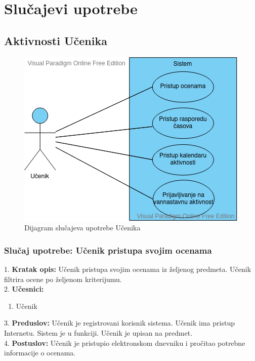 \documentclass{article}
\begin{document}
\newpage
\section{Slučajevi upotrebe}

\subsection{Aktivnosti Učenika}

\begin{figure} [!ht]
    \begin{center}
        \includegraphics[scale=0.6]{imgs/ucenik_use_case.png}
    \end{center}
\caption{Dijagram slučajeva upotrebe Učenika}
\end{figure}


\subsubsection{Slučaj upotrebe: Učenik pristupa svojim ocenama} 
1. \textbf{Kratak opis:} Učenik pristupa svojim ocenama iz željenog predmeta. Učenik filtrira ocene po željenom kriterijumu. \\

2. \textbf{Učesnici:}
\begin{enumerate} [label=(\alph*)]
\item Učenik
\end{enumerate} 

3. \textbf{Preduslov:} Učenik je registrovani korisnik sistema. Učenik ima pristup Internetu. Sistem je u funkciji. Učenik je upisan na predmet. \\

4. \textbf{Postuslov:} Učenik je pristupio elektronskom dnevniku i pročitao potrebne informacije o ocenama.\\
\end{document}
